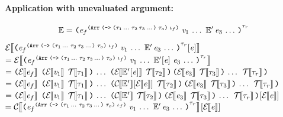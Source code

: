 \begin{sproof}
\paragraph{Application with unevaluated argument:}
  \[\ctxt =
  \notedapp[\type_r]
  {\annotate
    [\typearray{\typefun{\sequence{\type_1}\,\type_2\,\sequence{\type_3}}{\type_o}}{\idx_f}]
    {\expr_f}}
  {\sequence{\val_1}\,\ctxt'\,\sequence{\expr_3}}\]
  $\EraseE{\fillc
    {\notedapp[\type_r]
      {\annotate
        [\typearray{\typefun{\sequence{\type_1}\,\type_2\,\sequence{\type_3}}{\type_o}}{\idx_f}]
        {\expr_f}}
      {\sequence{\val_1}\,\ctxt'\,\sequence{\expr_3}}}
    {\expr}}$ \\
  $= \EraseE{\notedapp[\type_r]
    {\annotate
      [\typearray{\typefun{\sequence{\type_1}\,\type_2\,\sequence{\type_3}}{\type_o}}{\idx_f}]
      {\expr_f}}
    {\sequence{\val_1}\,\fillc{\ctxt'}{\expr}\,\sequence{\expr_3}}}$ \\
  $= \app
  {\EraseE{\expr_f}}
  {\sequence{\ttsexp{\EraseE{\val_1}}{\EraseT{\type_1}}}
    \,\ttsexp{\EraseE{\fillc{\ctxt'}{\expr}}}{\EraseT{\type_2}}
    \,\sequence{\ttsexp{\EraseE{\expr_3}}{\EraseT{\type_3}}}
    \;\EraseT{\type_r}}$ \\
  $= \app
  {\EraseE{\expr_f}}
  {\sequence{\ttsexp{\EraseE{\val_1}}{\EraseT{\type_1}}}
    \,\ttsexp{\fillc{\EraseC{\ctxt'}}{\EraseE{\expr}}}{\EraseT{\type_2}}
    \,\sequence{\ttsexp{\EraseE{\expr_3}}{\EraseT{\type_3}}}
    \;\EraseT{\type_r}}$ \\
  $= \fillc
  {\app
    {\EraseE{\expr_f}}
    {\sequence{\ttsexp{\EraseE{\val_1}}{\EraseT{\type_1}}}
      \,\ttsexp{\EraseC{\ctxt'}}{\EraseT{\type_2}}
      \,\sequence{\ttsexp{\EraseE{\expr_3}}{\EraseT{\type_3}}}
      \;\EraseT{\type_r}}}
  {\EraseE{\expr}}$ \\
  $= \fillc
  {\EraseC{\notedapp[\type_r]
      {\annotate
        [\typearray{\typefun{\sequence{\type_1}\,\type_2\,\sequence{\type_3}}{\type_o}}{\idx_f}]
        {\expr_f}}
      {\sequence{\val_1}\,\ctxt'\,\sequence{\expr_3}}}}
  {\EraseE{\expr}}$ \\


\end{sproof}
